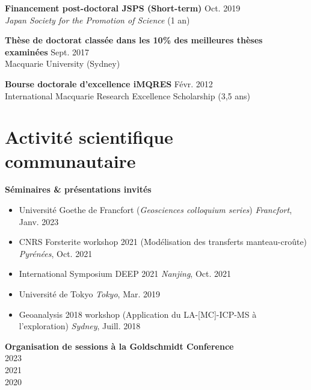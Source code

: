 \documentclass[a4paper,11pt]{article}
\begin{document}
    \textbf{Financement post-doctoral JSPS (Short-term)}
    \hfill {Oct. 2019}\\
    \textit{Japan Society for the Promotion of Science} (1 an)
    
    \textbf{Thèse de doctorat classée dans les 10\% des meilleures thèses examinées}
    \hfill {Sept. 2017}\\
    Macquarie University (Sydney)
    
    \textbf{Bourse doctorale d’excellence iMQRES}
    \hfill {Févr. 2012}\\
    International Macquarie Research Excellence Scholarship (3,5 ans)

\section{Activité scientifique communautaire}

    \textbf{Séminaires \& présentations invités}
    \begin{itemize}[label={},itemsep=0pt,parsep=0pt]
        \item Université Goethe de Francfort (\textit{Geosciences colloquium series})
            \hfill \textit{Francfort}, {Janv. 2023}
        \item CNRS Forsterite workshop 2021 (Modélisation des transferts manteau-croûte)
            \hfill \textit{Pyrénées}, {Oct. 2021}
        \item International Symposium DEEP 2021
            \hfill \textit{Nanjing}, {Oct. 2021}
        \item Université de Tokyo
            \hfill \textit{Tokyo}, {Mar. 2019}
        \item Geoanalysis 2018 workshop (Application du LA-[MC]-ICP-MS à l'exploration)
            \hfill \textit{Sydney}, {Juill. 2018}
    \end{itemize}

    \textbf{Organisation de sessions à la Goldschmidt Conference}\\
     \hfill {2023}\\
     \hfill {2021} \\
     \hfill {2020}
    
\end{document}
